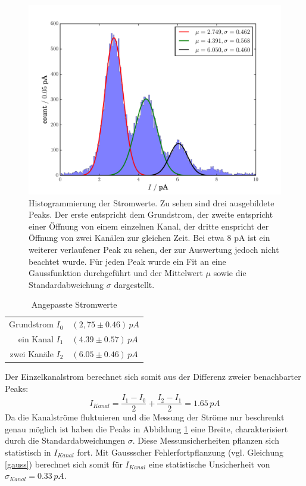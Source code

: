 \documentclass{include/thesisclass3}
\newcommand{\e}[1]{\,\si{#1}}
\begin{document}
\begin{figure}[H]
\centering
\includegraphics[scale=0.7]{images/single_hist.pdf}
\caption{Histogrammierung der Stromwerte. Zu sehen sind drei ausgebildete Peaks. Der erste entspricht dem Grundstrom, der zweite entspricht einer Öffnung von einem einzelnen Kanal, der dritte enspricht der Öffnung von zwei Kanälen zur gleichen Zeit. Bei etwa 8 pA ist ein weiterer verlaufener Peak zu sehen, der zur Auswertung jedoch nicht beachtet wurde. Für jeden Peak wurde ein Fit an eine Gaussfunktion durchgeführt und der Mittelwert $\mu$ sowie die Standardabweichung $\sigma$ dargestellt.}
\label{singlehist}
\end{figure}
\begin{table}[H]
\centering
\caption{Angepasste Stromwerte}
\label{singlefits}
\begin{tabular}{rl}
\toprule
Grundstrom $I_0$ & $(2,75 \pm 0.46)\e{pA}$\\
ein Kanal $I_1$ & $(4.39 \pm 0.57)\e{pA}$\\
zwei Kanäle $I_2$ & $(6.05\pm 0.46)\e{pA}$\\
\end{tabular}
\end{table}
Der Einzelkanalstrom berechnet sich somit aus der Differenz zweier benachbarter Peaks:
\[
I_{Kanal} = \frac{I_1-I_0}{2} + \frac{I_2-I_1}{2} = 1.65\e{pA}\]
Da die Kanalströme fluktuieren und die Messung der Ströme nur beschrenkt genau möglich ist haben die Peaks in Abbildung \ref{singlehist} eine Breite, charakterisiert durch die Standardabweichungen $\sigma$. Diese Messunsicherheiten pflanzen sich statistisch in $I_{Kanal}$ fort. Mit Gaussscher Fehlerfortpflanzung (vgl. Gleichung \ref{gauss}) berechnet sich somit für $I_{Kanal}$ eine statistische Unsicherheit von $\sigma_{Kanal} = 0.33\e{pA}$.
\end{document}
